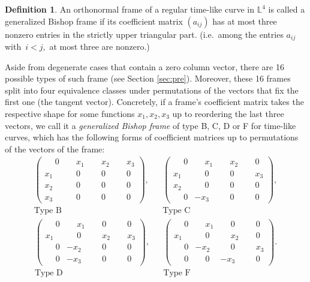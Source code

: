 \documentclass[a4paper]{amsart}
\theoremstyle{definition}
\newtheorem{definition}[theorem]{Definition}
\theoremstyle{remark}
\newcommand{\LL}{\mathbb{L}}
\numberwithin{equation}{section}
\begin{document}
\begin{definition}
An orthonormal frame of a regular time-like curve in $\LL^{4}$ is called a generalized Bishop frame if its coefficient matrix $(a_{ij})$ has at most three nonzero entries in the strictly upper triangular part. (i.e.\ among the entries $a_{ij}$ with $\, i< j,$ at most three are nonzero.)
\end{definition}
Aside from degenerate cases that contain a zero column vector, 
there are 16 possible types of such frame (see Section \ref{sec:pre}). Moreover, these 16 frames split into four equivalence classes under permutations of the vectors that fix the first one (the tangent vector). Concretely, if a frame's coefficient matrix takes the respective shape for some functions $x_1,x_2, x_3$ up to reordering the last three vectors, we call it a \emph{generalized Bishop frame} of type B, C, D or F for time-like curves, which has the following forms of coefficient matrices up to permutations of the vectors of the frame:
\begin{align*}
\begin{pmatrix}
\phantom{-}0&\phantom{-}x_{1}&\phantom{-}x_{2}&\phantom{-}x_{3}\\
x_{1}&\phantom{-}0&\phantom{-}0&\phantom{-}0\\
x_{2}&\phantom{-}0&\phantom{-}0&\phantom{-}0\\
x_{3}&\phantom{-}0&\phantom{-}0&\phantom{-}0
\end{pmatrix}
, && 
\begin{pmatrix}
\phantom{-}0&\phantom{-}x_{1}&\phantom{-}x_{2}&\phantom{-}0\\
x_{1}&\phantom{-}0&\phantom{-}0&\phantom{-}x_{3}\\
x_{2}&\phantom{-}0&\phantom{-}0&\phantom{-}0\\
\phantom{-}0&-x_{3}&\phantom{-}0&\phantom{-}0
\end{pmatrix}, \\
\text{Type B} \hspace{40pt}&& \text{Type C}\hspace{40pt} 
\end{align*}
\begin{align*}
\begin{pmatrix}
\phantom{-}0&\phantom{-}x_{1}&\phantom{-}0&\phantom{-}0\\
x_{1}&\phantom{-}0&\phantom{-}x_{2}&\phantom{-}x_{3}\\
\phantom{-}0&-x_{2}&\phantom{-}0&\phantom{-}0\\
\phantom{-}0&-x_{3}&\phantom{-}0&\phantom{-}0
\end{pmatrix}, &&
\begin{pmatrix}
\phantom{-}0&\phantom{-}x_{1}&\phantom{-}0&\phantom{-}0\\
x_{1}&\phantom{-}0&\phantom{-}x_{2}&\phantom{-}0\\
\phantom{-}0&-x_{2}&\phantom{-}0&\phantom{-}x_{3}\\
\phantom{-}0&\phantom{-}0&-x_{3}&\phantom{-}0
\end{pmatrix}. \\
\text{Type D}\hspace{40pt} && \text{Type F}\hspace{40pt} 
\end{align*}
\end{document}
